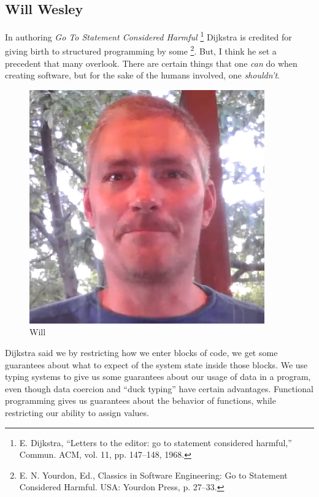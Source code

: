 \subsection{Will Wesley}

In authoring \emph{Go To Statement Considered Harmful}
\footnote{E. Dijkstra, “Letters to the editor: go to statement considered harmful,” Commun. ACM, vol. 11, pp. 147–148, 1968.}
Dijkstra is credited for giving birth to structured programming by some
\footnote{E. N. Yourdon, Ed., Classics in Software Engineering: Go to Statement Considered Harmful.
USA: Yourdon Press, p. 27–33.}.
But, I think he set a precedent that many overlook.
There are certain things that one \emph{can} do when creating software, but for the sake of the humans involved, one \emph{shouldn't}.

\begin{figure}
  \includegraphics[width=\linewidth]{Wesley}
  \caption{Will}
  \label{fig:will}
\end{figure}
Dijkstra said we by restricting how we enter blocks of code, we get some guarantees about what to expect of the system state inside those blocks.
We use typing systems to give us some guarantees about our usage of data in a program, even though data coercion and ``duck typing'' have certain advantages.
Functional programming gives us guarantees about the behavior of functions, while restricting our ability to assign values.

